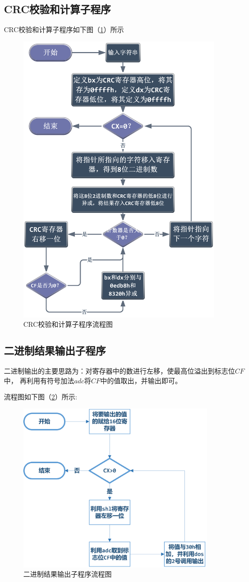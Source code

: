 \documentclass[UTF-8, a4paper, 12pt]{ctexart}
\begin{document}
\subsection{CRC校验和计算子程序}
CRC校验和计算子程序如下图（\ref{1}）所示
\begin{figure}[htbp]
    \centering
    \includegraphics[height=15cm]{fig/f1.png}
    \caption{CRC校验和计算子程序流程图}
    \label{1}
\end{figure}

\subsection{二进制结果输出子程序}
二进制输出的主要思路为：对寄存器中的数进行左移，使最高位溢出到标志位$CF$中，
再利用有符号加法$adc$将$CF$中的值取出，并输出即可。

流程图如下图（\ref{bin}）所示:
\begin{figure}[htbp]
    \centering
    \includegraphics[width=10cm]{fig/f5.png}
    \caption{二进制结果输出子程序流程图}
    \label{bin}
\end{figure}
\end{document}
